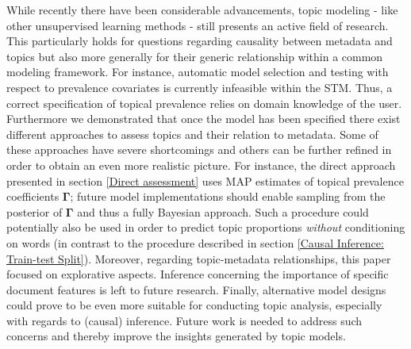 While recently there have been considerable advancements, topic modeling - like other unsupervised learning methods - still presents an active field of research. This particularly holds for questions regarding causality between metadata and topics but also more generally for their generic relationship within a common modeling framework. For instance, automatic model selection and testing with respect to prevalence covariates is currently infeasible within the STM. Thus, a correct specification of topical prevalence relies on domain knowledge of the user. Furthermore we demonstrated that once the model has been specified there exist different approaches to assess topics and their relation to metadata. Some of these approaches have severe shortcomings and others can be further refined in order to obtain an even more realistic picture. For instance, the direct approach presented in section \ref{Direct assessment} uses MAP estimates of topical prevalence coefficients $\boldsymbol{\Gamma}$; future model implementations should enable sampling from the posterior of $\boldsymbol{\Gamma}$ and thus a fully Bayesian approach. Such a procedure could potentially also be used in order to predict topic proportions \textit{without} conditioning on words (in contrast to the procedure described in section \ref{Causal Inference: Train-test Split}). Moreover, regarding topic-metadata relationships, this paper focused on explorative aspects. Inference concerning the importance of specific document features is left to future research. Finally, alternative model designs could prove to be even more suitable for conducting topic analysis, especially with regards to (causal) inference. Future work is needed to address such concerns and thereby improve the insights generated by topic models.

